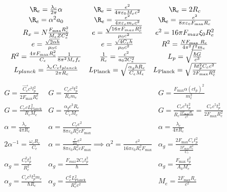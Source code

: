     \begin{gather*}
        \begin{array}{ccc}
            \R_e = \frac{\lambda_c}{2 \pi} \alpha & \R_e = \frac{e^2}{4 \pi \varepsilon_0 M_e c^2} & \R_e = 2 R_c \\
            \R_e = \alpha^2 a_0 & \R_e = \frac{e^2}{4 \pi \varepsilon_c m_c c^2} & \R_e = \frac{e^2}{8 \pi \varepsilon_0 F_{\max} R_c} \\
            R_x = N \frac{F_{\max} R_c^2}{M_e Z C_e^2} & e = \frac{\sqrt{16 \pi F_{max} R_c^2}}{\mu_0 c^2} & e^2 = 16 \pi F_{max} \xi_0 R_e^2 \\
            e = \frac{\sqrt{2 \alpha h}}{\mu_0 c} & e = \frac{\sqrt{4 C_e h}}{\mu_0 c^2} & R^2 = \frac{N F_{\text {max }} R_c}{4 \pi^2 f^2 m_e} \\
            R^2 = \frac{4 \pi F_{\max} R_c^2}{C_e} \frac{1}{8 \pi^2 M_e f_e} & \frac{1}{R_c} = \frac{c^2}{a_0 2 C_e^2} & {L_p} = \sqrt{\frac{\hbar G}{c^3}} \\
            L_{planck} = \frac{\lambda_e C_e t_{planck}}{2 \pi R_c} & L_{\text{Planck}} = \sqrt{\frac{\alpha_g \hbar R_c}{C_e M_e}} & L_{\text{Planck}} = \sqrt{\frac{\hbar t_p^2 C_e c^2}{2 F_{\max} R_c^2}} \\
        \end{array}
    \end{gather*}
\begin{gather*}
    \begin{array}{ccc}
            G = \frac{\vec{C_e} c^3 l_p^2}{2 F_{\max } R_c^2} & G = \frac{C_e c^3 t_p^2}{R_c m_e} & G = \frac{F_{\operatorname{max}} \alpha (c t_p)^2}{m_e^2} \\
            G = \frac{C_e c L_{\text{Planck}}^2}{R_c M_e} & G = \frac{\alpha_g c^3 R_c}{C_e M_e} & G = \frac{C_e c^3 t_p^2}{R_c \frac{2 F_{\max} R_c}{c^2}} = \frac{C_e c^5 t_p^2}{2 F_{\max} R_c^2} \\
            \alpha = \frac{\lambda_e}{4 \pi R_c} & \alpha = \frac{C_e e^2}{8 \pi \varepsilon_0 R_c^2 c F_{\max}} & \alpha = \frac{\lambda_c}{4 \pi R_c} \\
            2\alpha^{-1} = \frac{\omega_c R_c}{C_e} & \alpha = \frac{\frac{c}{2 \alpha} e^2}{8 \pi \varepsilon_0 R_c^2 c F_{\max}} \implies \alpha^2 = \frac{e^2}{16 \pi \varepsilon_0 R_c^2 F_{\max}} & \alpha_g = \frac{2F_{\max} C_e t_p^2}{\frac{2F_{\max} R_c^2}{C_e}} \\
            \alpha_g = \frac{C_e^2 t_p^2}{R_c^2} & \alpha_g = \frac{F_{max} 2 C_e t_p^2}{\hbar} & \alpha_g = \frac{F_{\text {max }} t_p^2}{A_0 M_e} \\
            \alpha_g = \frac{C_e c^2 t_p^2 m_e}{\hbar R_c} & \alpha_g = \frac{C_e^2 L_{\text{Planck}}^2}{R_c^2 c^2} & M_e = \frac{2 F_{\max} R_c}{c^2} \\
        \end{array}
    \end{gather*}
